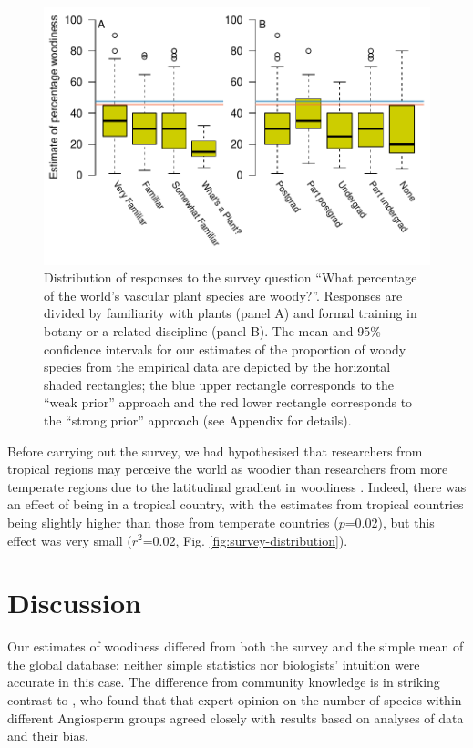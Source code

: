 \begin{figure}[p]
  \centering
  \includegraphics[width=\textwidth]{figs/survey-results}
  \caption[Survey results by familiarity and training]{Distribution of responses to the survey question ``What
    percentage of the world's vascular plant species are
    woody?''. Responses are divided by familiarity with plants
    (panel A) and formal training in botany or a related discipline
    (panel B). The mean and 95\% confidence intervals for our
    estimates of the proportion of woody species from the empirical
    data are depicted by the horizontal shaded rectangles; the blue
    upper rectangle corresponds to the ``weak prior'' approach and the
    red lower rectangle corresponds to the ``strong prior'' approach
    (see Appendix for details).}
  \label{fig:survey}
\end{figure}


Before carrying out the survey, we had hypothesised that researchers
from tropical regions may perceive the world as woodier than
researchers from more temperate regions due to the latitudinal
gradient in woodiness \citep{Molesheihgt}.
%
Indeed, there was an effect of being in a tropical country, with the
estimates from tropical countries being slightly higher than those
from temperate countries ($p$=0.02), but this effect was very small
($r^2$=0.02, Fig. \ref{fig:survey-distribution}).

\section{Discussion}

Our estimates of woodiness differed from both the survey and the
simple mean of the global database: neither simple statistics nor
biologists' intuition were accurate in this case.  The difference from
community knowledge is in striking contrast to \citet{joppa2010}, who
found that that expert opinion on the number of species within
different Angiosperm groups agreed closely with results based on
analyses of data and their bias.

